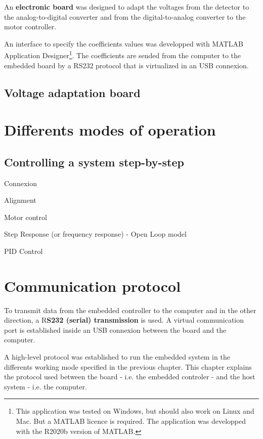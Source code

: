 \documentclass[14pt,fleqn]{book} %
\begin{document}
An \textbf{electronic board} was designed to adapt the voltages from the detector to the analog-to-digital converter and from the digital-to-analog converter to the motor controller. 

An interface to specify the coefficients values was developped with MATLAB\textregistered{} Application Designer\footnote{This application was tested on Windows, but should also work on Linux and Mac. But a MATLAB\textregistered{} licence is required. The application was developped with the R2020b version of MATLAB\textregistered{}.}. The coefficients are sended from the computer to the embedded board by a RS232 protocol that is virtualized in an USB connexion.

\section{Voltage adaptation board}



\chapter{Differents modes of operation}

\section{Controlling a system step-by-step}

Connexion

Alignment

Motor control

Step Response (or frequency response) - Open Loop model

PID Control



\chapter{Communication protocol}

To transmit data from the embedded controller to the computer and in the other direction, a R\textbf{S232 (serial) transmission} is used. A virtual communication port is established inside an USB connexion between the board and the computer.

A high-level protocol was established to run the embedded system in the differents working mode specified in the previous chapter. This chapter explains the protocol used between the board - i.e. the embedded controler - and the host system - i.e. the computer.
\end{document}
